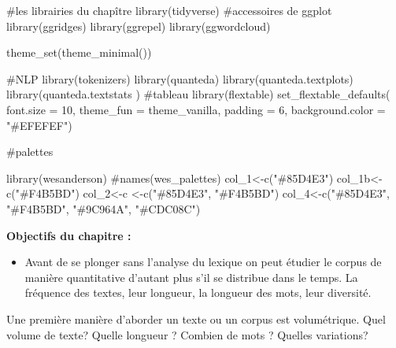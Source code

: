 \documentclass[
  letterpaper,
  DIV=11,
  numbers=noendperiod]{scrreprt}
\newenvironment{Shaded}{\begin{snugshade}}{\end{snugshade}}
\newcommand{\AttributeTok}[1]{\textcolor[rgb]{0.40,0.45,0.13}{#1}}
\newcommand{\CommentTok}[1]{\textcolor[rgb]{0.37,0.37,0.37}{#1}}
\newcommand{\DecValTok}[1]{\textcolor[rgb]{0.68,0.00,0.00}{#1}}
\newcommand{\FunctionTok}[1]{\textcolor[rgb]{0.28,0.35,0.67}{#1}}
\newcommand{\NormalTok}[1]{\textcolor[rgb]{0.00,0.23,0.31}{#1}}
\newcommand{\OtherTok}[1]{\textcolor[rgb]{0.00,0.23,0.31}{#1}}
\newcommand{\StringTok}[1]{\textcolor[rgb]{0.13,0.47,0.30}{#1}}
\providecommand{\tightlist}{%
  \setlength{\itemsep}{0pt}\setlength{\parskip}{0pt}}\usepackage{longtable,booktabs,array}
\begin{document}
\begin{Shaded}
\begin{Highlighting}[]
\CommentTok{\#les librairies du chapître}
\FunctionTok{library}\NormalTok{(tidyverse)}
\CommentTok{\#accessoires de ggplot}
\FunctionTok{library}\NormalTok{(ggridges)}
\FunctionTok{library}\NormalTok{(ggrepel)}
\FunctionTok{library}\NormalTok{(ggwordcloud)}

\FunctionTok{theme\_set}\NormalTok{(}\FunctionTok{theme\_minimal}\NormalTok{()) }

\CommentTok{\#NLP}
\FunctionTok{library}\NormalTok{(tokenizers)}
\FunctionTok{library}\NormalTok{(quanteda)}
\FunctionTok{library}\NormalTok{(quanteda.textplots)}
\FunctionTok{library}\NormalTok{(quanteda.textstats )}
\CommentTok{\#tableau}
\FunctionTok{library}\NormalTok{(flextable)}
\FunctionTok{set\_flextable\_defaults}\NormalTok{(}
  \AttributeTok{font.size =} \DecValTok{10}\NormalTok{, }\AttributeTok{theme\_fun =}\NormalTok{ theme\_vanilla,}
  \AttributeTok{padding =} \DecValTok{6}\NormalTok{,}
  \AttributeTok{background.color =} \StringTok{"\#EFEFEF"}\NormalTok{)}

\CommentTok{\#palettes}

\FunctionTok{library}\NormalTok{(wesanderson)}
\CommentTok{\#names(wes\_palettes)}
\NormalTok{col\_1}\OtherTok{\textless{}{-}}\FunctionTok{c}\NormalTok{(}\StringTok{"\#85D4E3"}\NormalTok{)}
\NormalTok{col\_1b}\OtherTok{\textless{}{-}}\FunctionTok{c}\NormalTok{(}\StringTok{"\#F4B5BD"}\NormalTok{)}
\NormalTok{col\_2}\OtherTok{\textless{}{-}}\NormalTok{c }\OtherTok{\textless{}{-}}\FunctionTok{c}\NormalTok{(}\StringTok{"\#85D4E3"}\NormalTok{, }\StringTok{"\#F4B5BD"}\NormalTok{)}
\NormalTok{col\_4}\OtherTok{\textless{}{-}}\FunctionTok{c}\NormalTok{(}\StringTok{"\#85D4E3"}\NormalTok{, }\StringTok{"\#F4B5BD"}\NormalTok{, }\StringTok{"\#9C964A"}\NormalTok{, }\StringTok{"\#CDC08C"}\NormalTok{)}
\end{Highlighting}
\end{Shaded}

\textbf{Objectifs du chapitre :}

\begin{itemize}
\tightlist
\item
  Avant de se plonger sans l'analyse du lexique on peut étudier le
  corpus de manière quantitative d'autant plus s'il se distribue dans le
  temps. La fréquence des textes, leur longueur, la longueur des mots,
  leur diversité.
\end{itemize}

Une première manière d'aborder un texte ou un corpus est volumétrique.
Quel volume de texte? Quelle longueur ? Combien de mots ? Quelles
variations?
\end{document}

